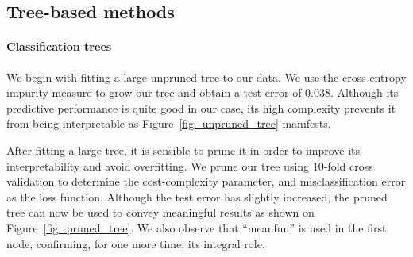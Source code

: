 \subsection{Tree-based methods}
\paragraph{Classification trees}
We begin with fitting a large unpruned tree to our data. We use the cross-entropy impurity measure to grow our tree and obtain a test error of \num{0.038}. Although its predictive performance is quite good in our case, its high complexity prevents it from being interpretable as Figure~\ref{fig_unpruned_tree} manifests.

After fitting a large tree, it is sensible to prune it in order to improve its interpretability and avoid overfitting. We prune our tree using \num{10}-fold cross validation to determine the cost-complexity parameter, and misclassification error as the loss function. Although the test error has slightly increased, the pruned tree can now be used to convey meaningful results as shown on Figure~\ref{fig_pruned_tree}. We also observe that ``meanfun'' is used in the first node, confirming, for one more time, its integral role.
\setlength{\BoxPlotFigWidth}{0.48\textwidth}

